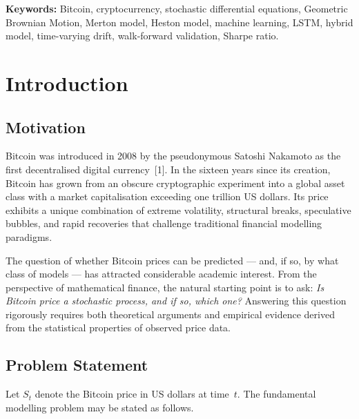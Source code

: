\documentclass[12pt, a4paper, oneside]{report}
\theoremstyle{plain}
\theoremstyle{definition}
\theoremstyle{remark}
\begin{document}
\textbf{Keywords:} Bitcoin, cryptocurrency, stochastic differential equations,
Geometric Brownian Motion, Merton model, Heston model, machine learning,
LSTM, hybrid model, time-varying drift, walk-forward validation, Sharpe ratio.

\clearpage
\tableofcontents

\clearpage
\chapter*{Introduction}

\section*{Motivation}

Bitcoin was introduced in 2008 by the pseudonymous Satoshi Nakamoto as the
first decentralised digital currency~[1].  In the sixteen years since its
creation, Bitcoin has grown from an obscure cryptographic experiment into a
global asset class with a market capitalisation exceeding one trillion US
dollars.  Its price exhibits a unique combination of extreme volatility,
structural breaks, speculative bubbles, and rapid recoveries that challenge
traditional financial modelling paradigms.

The question of whether Bitcoin prices can be predicted --- and, if so, by
what class of models --- has attracted considerable academic interest.  From
the perspective of mathematical finance, the natural starting point is to ask:
\emph{Is Bitcoin price a stochastic process, and if so, which one?}  Answering
this question rigorously requires both theoretical arguments and empirical
evidence derived from the statistical properties of observed price data.

\section*{Problem Statement}

Let $S_t$ denote the Bitcoin price in US dollars at time~$t$.  The fundamental
modelling problem may be stated as follows.
\end{document}
